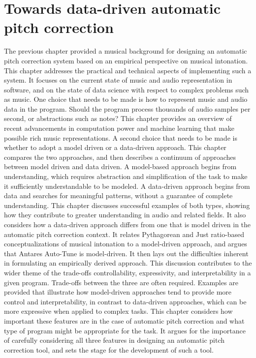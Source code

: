 \chapter{Towards data-driven automatic pitch correction}
\label{chap:tech-background}
The previous chapter provided a musical background for designing an automatic pitch correction system based on an empirical perspective on musical intonation. This chapter addresses the practical and technical aspects of implementing such a system. It focuses on the current state of music and audio representation in software, and on the state of data science with respect to complex problems such as music. One choice that needs to be made is how to represent music and audio data in the program. Should the program process thousands of audio samples per second, or abstractions such as notes? This chapter provides an overview of recent advancements in computation power and machine learning that make possible rich music representations. A second choice that needs to be made is whether to adopt a model driven or a data-driven approach. This chapter compares the two approaches, and then describes a continuum of approaches between model driven and data driven. A model-based approach begins from understanding, which requires abstraction and simplification of the task to make it sufficiently understandable to be modeled. A data-driven approach begins from data and searches for meaningful patterns, without a guarantee of complete understanding. This chapter discusses successful examples of both types, showing how they contribute to greater understanding in audio and related fields. It also considers how a data-driven approach differs from one that is model driven in the automatic pitch correction context. It relates Pythagorean and Just ratio-based conceptualizations of musical intonation to a model-driven approach, and argues that Antares Auto-Tune is model-driven. It then lays out the difficulties inherent in formulating an empirically derived approach. This discussion contributes to the wider theme of the trade-offs controllability, expressivity, and interpretability in a given program. Trade-offs between the three are often required. Examples are provided that illustrate how model-driven approaches tend to provide more control and interpretability, in contrast to data-driven approaches, which can be more expressive when applied to complex tasks. This chapter considers how important these features are in the case of automatic pitch correction and what type of program might be appropriate for the task. It argues for the importance of carefully considering all three features in designing an automatic pitch correction tool, and sets the stage for the development of such a tool. 

